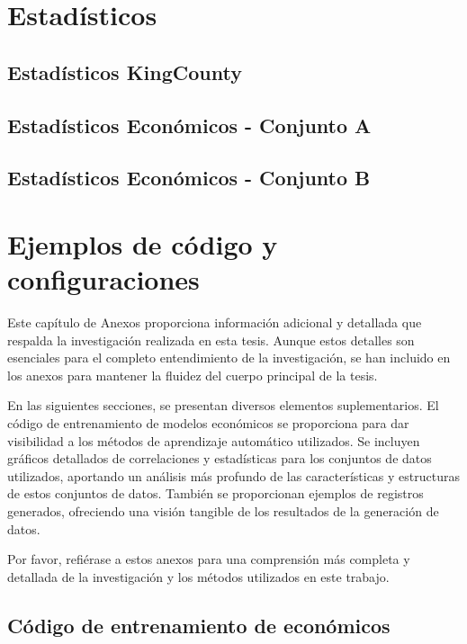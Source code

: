 \chapter{Estadísticos}
\section{Estadísticos KingCounty}
\label{propiedades-estadisticas-kingCounty}


\section{Estadísticos Económicos - Conjunto A}
\label{propiedades-estadisticas-economicos-A}



\section{Estadísticos Económicos - Conjunto B}
\label{propiedades-estadisticas-economicos-B}


\chapter{Ejemplos de código y configuraciones}
Este capítulo de Anexos proporciona información adicional y detallada que respalda la investigación realizada en esta tesis. Aunque estos detalles son esenciales para el completo entendimiento de la investigación, se han incluido en los anexos para mantener la fluidez del cuerpo principal de la tesis.

En las siguientes secciones, se presentan diversos elementos suplementarios. El código de entrenamiento de modelos económicos se proporciona para dar visibilidad a los métodos de aprendizaje automático utilizados. Se incluyen gráficos detallados de correlaciones y estadísticas para los conjuntos de datos utilizados, aportando un análisis más profundo de las características y estructuras de estos conjuntos de datos. También se proporcionan ejemplos de registros generados, ofreciendo una visión tangible de los resultados de la generación de datos.

Por favor, refiérase a estos anexos para una comprensión más completa y detallada de la investigación y los métodos utilizados en este trabajo.
\section{Código de entrenamiento de económicos}

